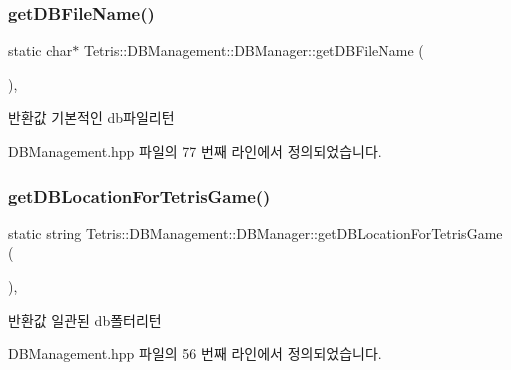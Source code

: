 \subsubsection{\texorpdfstring{get\+D\+B\+File\+Name()}{getDBFileName()}}
{\footnotesize\ttfamily static char$\ast$ Tetris\+::\+D\+B\+Management\+::\+D\+B\+Manager\+::get\+D\+B\+File\+Name (\begin{DoxyParamCaption}{ }\end{DoxyParamCaption})\hspace{0.3cm}{\ttfamily [inline]}, {\ttfamily [static]}}

\begin{DoxyReturn}{반환값}
기본적인 db파일리턴 
\end{DoxyReturn}


D\+B\+Management.\+hpp 파일의 77 번째 라인에서 정의되었습니다.

\mbox{\label{class_tetris_1_1_d_b_management_1_1_d_b_manager_ae50cfd222e276a5ca27e17c886aa5dd5}} 
\subsubsection{\texorpdfstring{get\+D\+B\+Location\+For\+Tetris\+Game()}{getDBLocationForTetrisGame()}}
{\footnotesize\ttfamily static string Tetris\+::\+D\+B\+Management\+::\+D\+B\+Manager\+::get\+D\+B\+Location\+For\+Tetris\+Game (\begin{DoxyParamCaption}{ }\end{DoxyParamCaption})\hspace{0.3cm}{\ttfamily [inline]}, {\ttfamily [static]}}

\begin{DoxyReturn}{반환값}
일관된 db폴터리턴 
\end{DoxyReturn}


D\+B\+Management.\+hpp 파일의 56 번째 라인에서 정의되었습니다.

